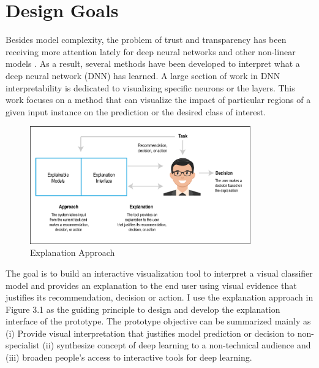 

\section{Design Goals}

Besides model complexity, the problem of trust and transparency has been receiving more attention lately for deep neural networks and other non-linear models \cite{edseee.839741120170101} \cite{edseee.863755220180101} \cite{S003132031630358220170501}. As a result, several methods have been developed to interpret what a deep neural network (DNN) has learned. A large section of work in DNN interpretability is dedicated to visualizing specific neurons or the layers. This work focuses on a method that can visualize the impact of particular regions of a given input instance on the prediction or the desired class of interest.

\begin{figure}[htbp]
\centering
\includegraphics[width=0.85\textwidth]{images/xai-1.eps}
\caption{Explanation Approach}
\label{fig:explanation-approach}
\end{figure}

The goal is to build an interactive visualization tool to interpret a visual classifier model and provides an explanation to the end user using visual evidence that justifies its recommendation, decision or action. I use the explanation approach in Figure 3.1 as the guiding principle to design and develop the explanation interface of the prototype.  The prototype objective can be summarized mainly as (i) Provide visual interpretation that justifies model prediction or decision to non-specialist (ii) synthesize concept of deep learning to a non-technical audience and (iii) broaden people’s access to interactive tools for deep learning.


